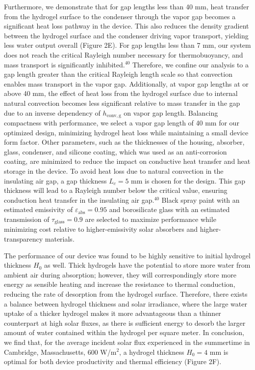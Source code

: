 \documentclass[11pt]{article}
\begin{document}
Furthermore, we demonstrate that for gap lengths less than 40 mm, heat transfer from the hydrogel surface to the condenser through the vapor gap becomes a significant heat loss pathway in the device. This also reduces the density gradient between the hydrogel surface and the condenser driving vapor transport, yielding less water output overall (Figure 2E). For gap lengths less than 7 mm, our system does not reach the critical Rayleigh number necessary for thermobuoyancy, and mass transport is significantly inhibited.$^{40}$ Therefore, we confine our analysis to a gap length greater than the critical Rayleigh length scale so that convection enables mass transport in the vapor gap. Additionally, at vapor gap lengths at or above 40 mm, the effect of heat loss from the hydrogel surface due to internal natural convection becomes less significant relative to mass transfer in the gap due to an inverse dependency of $h_{\mathrm{conv,g}}$ on vapor gap length. Balancing compactness with performance, we select a vapor gap length of 40 mm for our optimized design, minimizing hydrogel heat loss while maintaining a small device form factor. Other parameters, such as the thicknesses of the housing, absorber, glass, condenser, and silicone coating, which was used as an anti-corrosion coating, are minimized to reduce the impact on conductive heat transfer and heat storage in the device. To avoid heat loss due to natural convection in the insulating air gap, a gap thickness $L_{c} = 5$ mm is chosen for the design. This gap thickness will lead to a Rayleigh number below the critical value, ensuring conduction heat transfer in the insulating air gap.$^{40}$ Black spray paint with an estimated emissivity of $\varepsilon_{\mathrm{abs}} = 0.95$ and borosilicate glass with an estimated transmission of $\tau_{\mathrm{glass}} = 0.9$ are selected to maximize performance while minimizing cost relative to higher-emissivity solar absorbers and higher-transparency materials.

The performance of our device was found to be highly sensitive to initial hydrogel thickness $H_{0}$ as well. Thick hydrogels have the potential to store more water from ambient air during absorption; however, they will correspondingly store more energy as sensible heating and increase the resistance to thermal conduction, reducing the rate of desorption from the hydrogel surface. Therefore, there exists a balance between hydrogel thickness and solar irradiance, where the large water uptake of a thicker hydrogel makes it more advantageous than a thinner counterpart at high solar fluxes, as there is sufficient energy to desorb the larger amount of water contained within the hydrogel per square meter. In conclusion, we find that, for the average incident solar flux experienced in the summertime in Cambridge, Massachusetts, 600 W/m$^{2}$, a hydrogel thickness $H_{0} = 4$ mm is optimal for both device productivity and thermal efficiency (Figure 2F).
\end{document}
